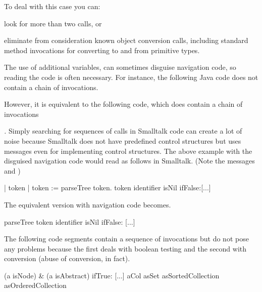 \documentclass[a4paper,10pt,twoside]{book}
\begin{document}
To deal with this case you can: 

\begin{bulletlist}
\item look for more than two calls, or 

\item eliminate from consideration known object conversion calls, including standard method invocations for converting to and from primitive types.
\end{bulletlist}

The use of additional variables, can sometimes disguise navigation code, so reading the code is often necessary. For instance, the following Java code does not contain a chain of invocations.

\begin{code}
Token token;
token = parseTree.token();
if (token.identifier() != null) {
	...
\end{code}

However, it is equivalent to the following code, which does contain a chain of invocations

\begin{code}
if (parseTree.token().identifier() != null) {
	...
\end{code}

\noindent
\emph{.}
Simply searching for sequences of calls in Smalltalk code can create a lot of noise because Smalltalk does not have predefined control structures but uses messages even for implementing control structures. The above example with the disguised navigation code would read as follows in Smalltalk. (Note the messages  and )

\begin{code}
| token |
token := parseTree token.
token identifier isNil ifFalse:[...]
\end{code}

The equivalent version with navigation code becomes.

\begin{code}
parseTree token identifier isNil ifFalse: [...]
\end{code}

The following code segments contain a sequence of invocations but do not pose any problems because the first deals with boolean testing and the second with conversion (abuse of conversion, in fact). 

\begin{code}
(a isNode) & (a isAbstract) ifTrue: [...]
aCol asSet asSortedCollection asOrderedCollection 
\end{code}
\end{document}
